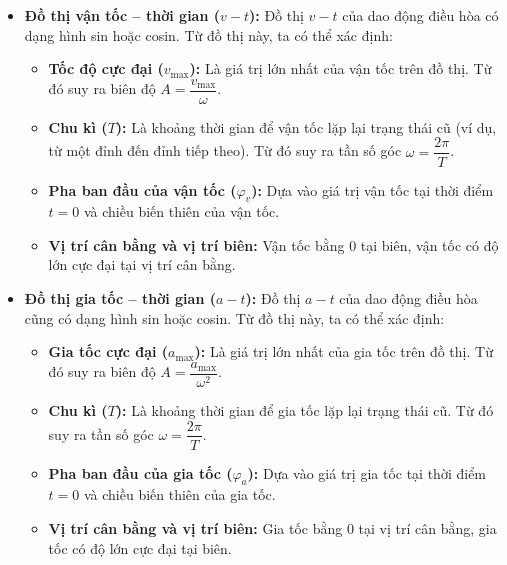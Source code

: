 \begin{kienthuc}
\begin{itemize}
    \item \textbf{Đồ thị vận tốc – thời gian ($v-t$):}
    Đồ thị $v-t$ của dao động điều hòa có dạng hình sin hoặc cosin. Từ đồ thị này, ta có thể xác định:
    \begin{itemize}
        \item \textbf{Tốc độ cực đại ($v_{\text{max}}$):} Là giá trị lớn nhất của vận tốc trên đồ thị. Từ đó suy ra biên độ $A = \dfrac{v_{\text{max}}}{\omega}$.
        \item \textbf{Chu kì ($T$):} Là khoảng thời gian để vận tốc lặp lại trạng thái cũ (ví dụ, từ một đỉnh đến đỉnh tiếp theo). Từ đó suy ra tần số góc $\omega = \dfrac{2\pi}{T}$.
        \item \textbf{Pha ban đầu của vận tốc ($\varphi_v$):} Dựa vào giá trị vận tốc tại thời điểm $t=0$ và chiều biến thiên của vận tốc.
        \item \textbf{Vị trí cân bằng và vị trí biên:} Vận tốc bằng 0 tại biên, vận tốc có độ lớn cực đại tại vị trí cân bằng.
    \end{itemize}
    \item \textbf{Đồ thị gia tốc – thời gian ($a-t$):}
    Đồ thị $a-t$ của dao động điều hòa cũng có dạng hình sin hoặc cosin. Từ đồ thị này, ta có thể xác định:
    \begin{itemize}
        \item \textbf{Gia tốc cực đại ($a_{\text{max}}$):} Là giá trị lớn nhất của gia tốc trên đồ thị. Từ đó suy ra biên độ $A = \dfrac{a_{\text{max}}}{\omega^2}$.
        \item \textbf{Chu kì ($T$):} Là khoảng thời gian để gia tốc lặp lại trạng thái cũ. Từ đó suy ra tần số góc $\omega = \dfrac{2\pi}{T}$.
        \item \textbf{Pha ban đầu của gia tốc ($\varphi_a$):} Dựa vào giá trị gia tốc tại thời điểm $t=0$ và chiều biến thiên của gia tốc.
        \item \textbf{Vị trí cân bằng và vị trí biên:} Gia tốc bằng 0 tại vị trí cân bằng, gia tốc có độ lớn cực đại tại biên.
    \end{itemize}
\end{itemize}
\end{kienthuc}

